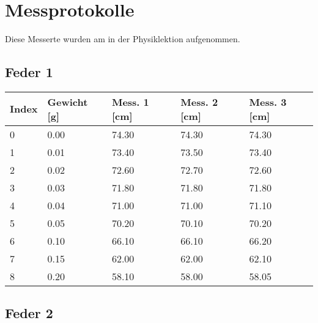 \documentclass[../main.tex]{subfiles} %
\begin{document}
\section{Messprotokolle}\label{sec:messprotokolle}

    Diese Messerte wurden am  in der Physiklektion aufgenommen.

    \subsection{Feder 1}\label{subsec:feder-1}

    \begin{center}
        \begin{tabular}{ |l|l|l|l|l| } \hline\rowcolor{Gray!50}
            Index & Gewicht [g] & Mess. 1 [cm] & Mess. 2 [cm] & Mess. 3 [cm] \\\toprule\hline
            0     & 0.00        & 74.30        & 74.30        & 74.30        \\\hline
            1     & 0.01        & 73.40        & 73.50        & 73.40        \\\hline
            2     & 0.02        & 72.60        & 72.70        & 72.60        \\\hline
            3     & 0.03        & 71.80        & 71.80        & 71.80        \\\hline
            4     & 0.04        & 71.00        & 71.00        & 71.10        \\\hline
            5     & 0.05        & 70.20        & 70.10        & 70.20        \\\hline
            6     & 0.10        & 66.10        & 66.10        & 66.20        \\\hline
            7     & 0.15        & 62.00        & 62.00        & 62.10        \\\hline
            8     & 0.20        & 58.10        & 58.00        & 58.05        \\\hline
        \end{tabular}
    \end{center}

    \subsection{Feder 2}\label{sec:feder-2}
\end{document}
